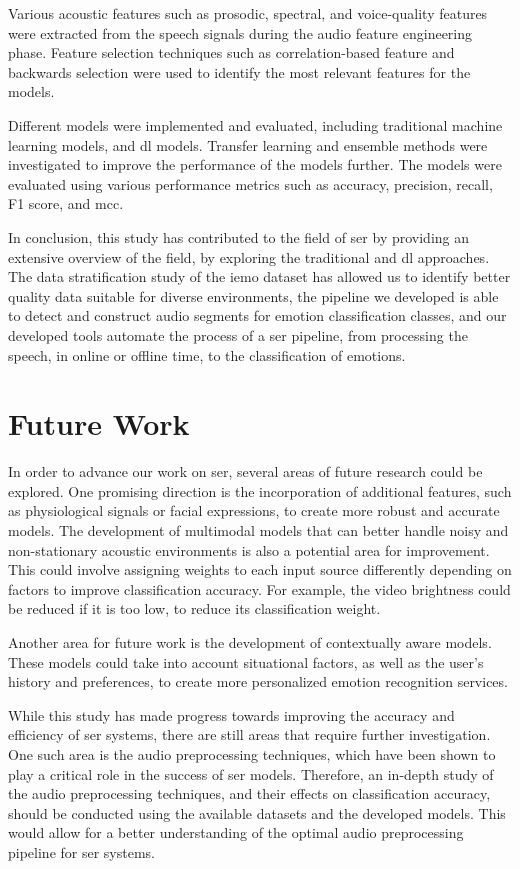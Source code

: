 Various acoustic features such as prosodic, spectral, and voice-quality features were extracted from the speech signals during the audio feature engineering phase. Feature selection techniques such as correlation-based feature and backwards selection were used to identify the most relevant features for the models.

Different models were implemented and evaluated, including traditional machine learning models, and \ac{dl} models. Transfer learning and ensemble methods were investigated to improve the performance of the models further. The models were evaluated using various performance metrics such as accuracy, precision, recall, F1 score, and \ac{mcc}.

In conclusion, this study has contributed to the field of \ac{ser} by providing an extensive overview of the field, by exploring the traditional and \ac{dl} approaches. The data stratification study of the \ac{iemo} dataset has allowed us to identify better quality data suitable for diverse environments, the pipeline we developed is able to detect and construct audio segments for emotion classification classes, and our developed tools automate the process of a \ac{ser} pipeline, from processing the speech, in online or offline time, to the classification of emotions.


\section{Future Work}

In order to advance our work on \ac{ser}, several areas of future research could be explored. One promising direction is the incorporation of additional features, such as physiological signals or facial expressions, to create more robust and accurate models. The development of multimodal models that can better handle noisy and non-stationary acoustic environments is also a potential area for improvement. This could involve assigning weights to each input source differently depending on factors to improve classification accuracy. For example, the video brightness could be reduced if it is too low, to reduce its classification weight.

Another area for future work is the development of contextually aware models. These models could take into account situational factors, as well as the user's history and preferences, to create more personalized emotion recognition services.

While this study has made progress towards improving the accuracy and efficiency of \ac{ser} systems, there are still areas that require further investigation. One such area is the audio preprocessing techniques, which have been shown to play a critical role in the success of \ac{ser} models. Therefore, an in-depth study of the audio preprocessing techniques, and their effects on classification accuracy, should be conducted using the available datasets and the developed models. This would allow for a better understanding of the optimal audio preprocessing pipeline for \ac{ser} systems.

